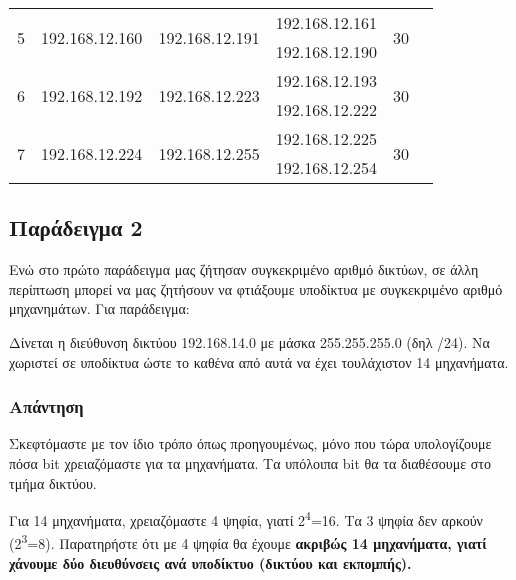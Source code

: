 \begin{center}
\begin{tabular}{|c|c|c|c|c|c|c|}
\multirow{2}{*}{5} & \multirow{2}{*}{192.168.12.160} & \multirow{2}{*}{192.168.12.191} & \multicolumn{2}{l|}{192.168.12.161} & \multirow{2}{*}{30} \\ \cline{4-5}
                  &                   &                   & \multicolumn{2}{l|}{192.168.12.190} &                   \\ \hline
\multirow{2}{*}{6} & \multirow{2}{*}{192.168.12.192} & \multirow{2}{*}{192.168.12.223} & \multicolumn{2}{l|}{192.168.12.193} & \multirow{2}{*}{30} \\ \cline{4-5}
                  &                   &                   & \multicolumn{2}{l|}{192.168.12.222} &                   \\ \hline
\multirow{2}{*}{7} & \multirow{2}{*}{192.168.12.224} & \multirow{2}{*}{192.168.12.255} & \multicolumn{2}{l|}{192.168.12.225} & \multirow{2}{*}{30} \\ \cline{4-5}
                  &                   &                   & \multicolumn{2}{l|}{192.168.12.254} &                   \\ \hline
\end{tabular}
\normalfont
\end{center}

\subsection*{Παράδειγμα 2}

Ενώ στο πρώτο παράδειγμα μας ζήτησαν συγκεκριμένο αριθμό δικτύων, σε άλλη περίπτωση μπορεί να μας ζητήσουν να φτιάξουμε υποδίκτυα με συγκεκριμένο αριθμό μηχανημάτων. Για παράδειγμα:

Δίνεται η διεύθυνση δικτύου 192.168.14.0 με μάσκα 255.255.255.0 (δηλ /24). Να χωριστεί σε υποδίκτυα ώστε το καθένα από αυτά να έχει τουλάχιστον 14 μηχανήματα. 

\subsubsection*{Απάντηση}

Σκεφτόμαστε με τον ίδιο τρόπο όπως προηγουμένως, μόνο που τώρα υπολογίζουμε πόσα bit χρειαζόμαστε για τα μηχανήματα. Τα υπόλοιπα bit θα τα διαθέσουμε στο τμήμα δικτύου.

Για 14 μηχανήματα, χρειαζόμαστε 4 ψηφία, γιατί 2\textsuperscript{4}=16. Τα 3 ψηφία δεν αρκούν (2\textsuperscript{3}=8). Παρατηρήστε ότι με 4 ψηφία θα έχουμε \textbf{ακριβώς 14 μηχανήματα, γιατί χάνουμε δύο διευθύνσεις ανά υποδίκτυο (δικτύου και εκπομπής).}
 
